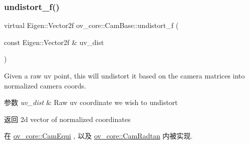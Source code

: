 \subsubsection{\texorpdfstring{undistort\+\_\+f()}{undistort\_f()}}
{\footnotesize\ttfamily virtual Eigen\+::\+Vector2f ov\+\_\+core\+::\+Cam\+Base\+::undistort\+\_\+f (\begin{DoxyParamCaption}\item[{const Eigen\+::\+Vector2f \&}]{uv\+\_\+dist }\end{DoxyParamCaption})\hspace{0.3cm}{\ttfamily [pure virtual]}}



Given a raw uv point, this will undistort it based on the camera matrices into normalized camera coords. 


\begin{DoxyParams}{参数}
{\em uv\+\_\+dist} & Raw uv coordinate we wish to undistort \\
\hline
\end{DoxyParams}
\begin{DoxyReturn}{返回}
2d vector of normalized coordinates 
\end{DoxyReturn}


在 \hyperlink{classov__core_1_1CamEqui_a737d6b4b634ae1da976d362158323059}{ov\+\_\+core\+::\+Cam\+Equi} , 以及 \hyperlink{classov__core_1_1CamRadtan_af02fa84ed2fdc895aaaf216184aa25ef}{ov\+\_\+core\+::\+Cam\+Radtan} 内被实现.

